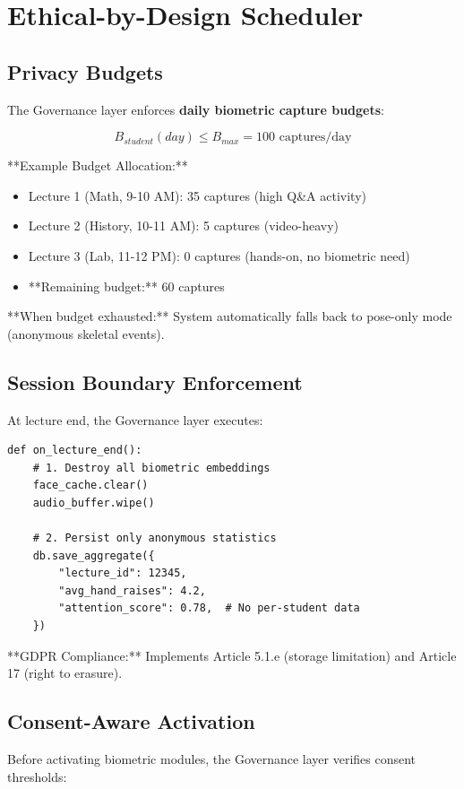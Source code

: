 \documentclass[conference]{IEEEtran}
\begin{document}
\section{Ethical-by-Design Scheduler}

\subsection{Privacy Budgets}
The Governance layer enforces \textbf{daily biometric capture budgets}:

\begin{equation}
B_{student}(day) \leq B_{max} = 100 \text{ captures/day}
\end{equation}

**Example Budget Allocation:**
\begin{itemize}
    \item Lecture 1 (Math, 9-10 AM): 35 captures (high Q\&A activity)
    \item Lecture 2 (History, 10-11 AM): 5 captures (video-heavy)
    \item Lecture 3 (Lab, 11-12 PM): 0 captures (hands-on, no biometric need)
    \item **Remaining budget:** 60 captures
\end{itemize}

**When budget exhausted:** System automatically falls back to pose-only mode (anonymous skeletal events).

\subsection{Session Boundary Enforcement}
At lecture end, the Governance layer executes:

\begin{verbatim}
def on_lecture_end():
    # 1. Destroy all biometric embeddings
    face_cache.clear()
    audio_buffer.wipe()
     
    # 2. Persist only anonymous statistics
    db.save_aggregate({
        "lecture_id": 12345,
        "avg_hand_raises": 4.2,
        "attention_score": 0.78,  # No per-student data
    })
\end{verbatim}

**GDPR Compliance:** Implements Article 5.1.e (storage limitation) and Article 17 (right to erasure).

\subsection{Consent-Aware Activation}
Before activating biometric modules, the Governance layer verifies consent thresholds:
\end{document}
